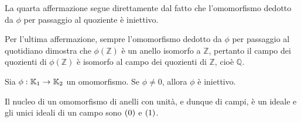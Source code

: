 \par La quarta affermazione segue direttamente dal fatto che l'omomorfismo dedotto da $\phi$ per passaggio al quoziente \`e iniettivo.
\par Per l'ultima affermazione, sempre l'omomorfismo dedotto da $\phi$ per passaggio al quotidiano dimostra che $\phi(\mathbb{Z})$ \`e un anello isomorfo a $\mathbb{Z}$, pertanto il campo dei quozienti di $\phi(\mathbb{Z})$ \`e isomorfo al campo dei quozienti di $\mathbb{Z}$, cio\`e $\mathbb{Q}$. \EndProof
\begin{Theorem}
	Sia $\phi: \mathbb{K}_1 \rightarrow \mathbb{K}_2$ un omomorfismo. Se $\phi \neq 0$, allora $\phi$ \`e iniettivo.
\end{Theorem}
\Proof Il nucleo di un omomorfismo di anelli con unit\`a, e dunque di campi, \`e un ideale e gli unici ideali di un campo sono $\left ( 0 \right )$ e $\left ( 1 \right )$. \EndProof
